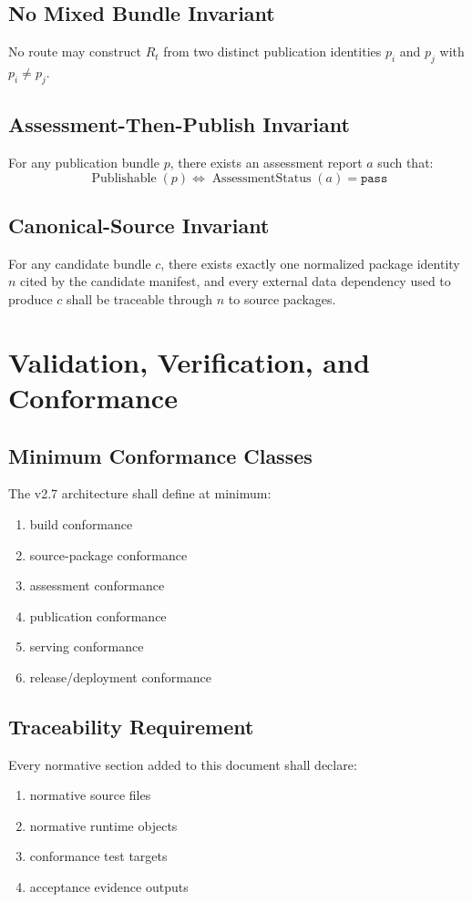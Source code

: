 \documentclass[11pt]{report}
\begin{document}
\section{No Mixed Bundle Invariant}
No route may construct \(R_t\) from two distinct publication identities \(p_i\) and \(p_j\) with \(p_i \ne p_j\).

\section{Assessment-Then-Publish Invariant}
For any publication bundle \(p\), there exists an assessment report \(a\) such that:
\[
\operatorname{Publishable}(p) \iff \operatorname{AssessmentStatus}(a)=\texttt{pass}
\]

\section{Canonical-Source Invariant}
For any candidate bundle \(c\), there exists exactly one normalized package identity \(n\) cited by the candidate manifest, and every external data dependency used to produce \(c\) shall be traceable through \(n\) to source packages.

\chapter{Validation, Verification, and Conformance}
\section{Minimum Conformance Classes}
The v2.7 architecture shall define at minimum:
\begin{enumerate}[leftmargin=1.2cm]
    \item build conformance
    \item source-package conformance
    \item assessment conformance
    \item publication conformance
    \item serving conformance
    \item release/deployment conformance
\end{enumerate}

\section{Traceability Requirement}
Every normative section added to this document shall declare:
\begin{enumerate}[leftmargin=1.2cm]
    \item normative source files
    \item normative runtime objects
    \item conformance test targets
    \item acceptance evidence outputs
\end{enumerate}
\end{document}
